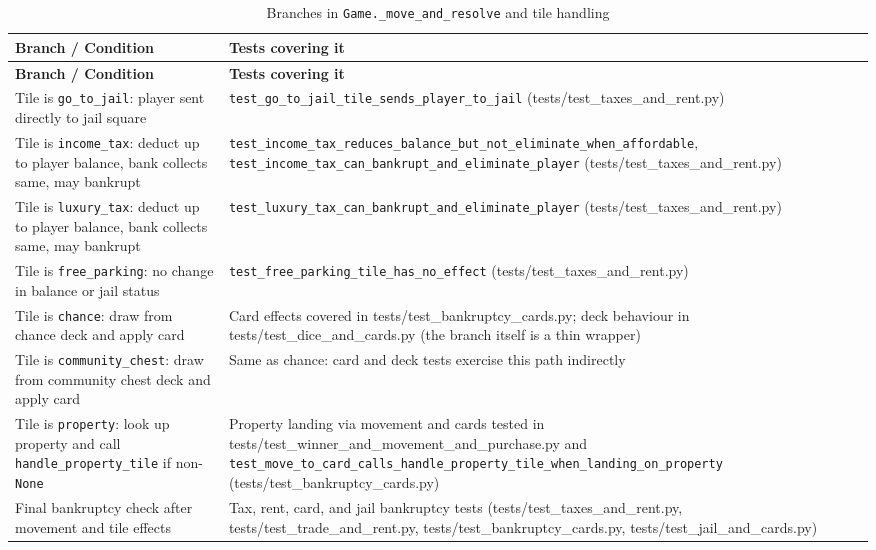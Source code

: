 \documentclass[11pt]{article}
\begin{document}
\begin{longtable}{>{\raggedright\arraybackslash}p{} >{\raggedright\arraybackslash}p{}}
\caption{Branches in \texttt{Game.\_move\_and\_resolve} and tile handling}\label{tab:game-move-resolve}\\\hline
\textbf{Branch / Condition} & \textbf{Tests covering it} \\ \hline
\endfirsthead
\hline
\textbf{Branch / Condition} & \textbf{Tests covering it} \\ \hline
\endhead
Tile is \texttt{go\_to\_jail}: player sent directly to jail square & \texttt{test\_go\_to\_jail\_tile\_sends\_player\_to\_jail} (tests/test\_taxes\_and\_rent.py) \\ \hline
Tile is \texttt{income\_tax}: deduct up to player balance, bank collects same, may bankrupt & \texttt{test\_income\_tax\_reduces\_balance\_but\_not\_eliminate\_when\_affordable}, \texttt{test\_income\_tax\_can\_bankrupt\_and\_eliminate\_player} (tests/test\_taxes\_and\_rent.py) \\ \hline
Tile is \texttt{luxury\_tax}: deduct up to player balance, bank collects same, may bankrupt & \texttt{test\_luxury\_tax\_can\_bankrupt\_and\_eliminate\_player} (tests/test\_taxes\_and\_rent.py) \\ \hline
Tile is \texttt{free\_parking}: no change in balance or jail status & \texttt{test\_free\_parking\_tile\_has\_no\_effect} (tests/test\_taxes\_and\_rent.py) \\ \hline
Tile is \texttt{chance}: draw from chance deck and apply card & Card effects covered in tests/test\_bankruptcy\_cards.py; deck behaviour in tests/test\_dice\_and\_cards.py (the branch itself is a thin wrapper) \\ \hline
Tile is \texttt{community\_chest}: draw from community chest deck and apply card & Same as chance: card and deck tests exercise this path indirectly \\ \hline
Tile is \texttt{property}: look up property and call \texttt{handle\_property\_tile} if non-\texttt{None} & Property landing via movement and cards tested in tests/test\_winner\_and\_movement\_and\_purchase.py and \texttt{test\_move\_to\_card\_calls\_handle\_property\_tile\_when\_landing\_on\_property} (tests/test\_bankruptcy\_cards.py) \\ \hline
Final bankruptcy check after movement and tile effects & Tax, rent, card, and jail bankruptcy tests (tests/test\_taxes\_and\_rent.py, tests/test\_trade\_and\_rent.py, tests/test\_bankruptcy\_cards.py, tests/test\_jail\_and\_cards.py) \\ \hline
\end{longtable}
\end{document}
